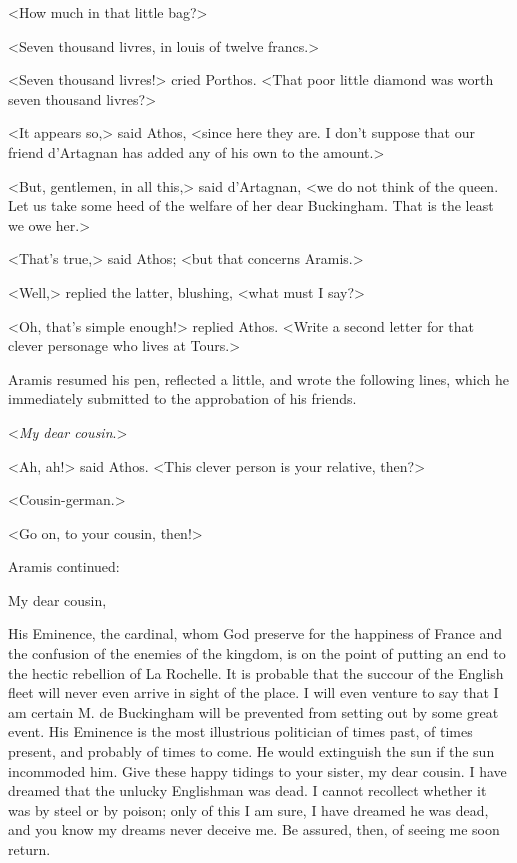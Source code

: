 <How much in that little bag?> 

<Seven thousand livres, in louis of twelve francs.> 

<Seven thousand livres!> cried Porthos. <That poor little diamond was worth seven thousand livres?> 

<It appears so,> said Athos, <since here they are. I don't suppose that our friend d'Artagnan has added any of his own to the amount.> 

<But, gentlemen, in all this,> said d'Artagnan, <we do not think of the queen. Let us take some heed of the welfare of her dear Buckingham. That is the least we owe her.> 

<That's true,> said Athos; <but that concerns Aramis.> 

<Well,> replied the latter, blushing, <what must I say?> 

<Oh, that's simple enough!> replied Athos. <Write a second letter for that clever personage who lives at Tours.> 

Aramis resumed his pen, reflected a little, and wrote the following lines, which he immediately submitted to the approbation of his friends. 

<\textit{My dear cousin}.> 

<Ah, ah!> said Athos. <This clever person is your relative, then?> 

<Cousin-german.> 

<Go on, to your cousin, then!> 

Aramis continued: 

\begin{mail}{}{My dear cousin,}
	
His Eminence, the cardinal, whom God preserve for the happiness of France and the confusion of the enemies of the kingdom, is on the point of putting an end to the hectic rebellion of La Rochelle. It is probable that the succour of the English fleet will never even arrive in sight of the place. I will even venture to say that I am certain M. de Buckingham will be prevented from setting out by some great event. His Eminence is the most illustrious politician of times past, of times present, and probably of times to come. He would extinguish the sun if the sun incommoded him. Give these happy tidings to your sister, my dear cousin. I have dreamed that the unlucky Englishman was dead. I cannot recollect whether it was by steel or by poison; only of this I am sure, I have dreamed he was dead, and you know my dreams never deceive me. Be assured, then, of seeing me soon return.
\end{mail}

